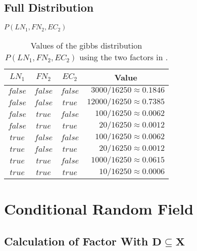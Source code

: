 \subsection{Full Distribution}\label{app:subsec-gd-full-distribution}
\begin{table}[h!]
\centering
$P(LN_1,FN_2,EC_2)$\par
\smallskip
\begin{tabular}{c c c r}
 \toprule
 $LN_1$ & $FN_2$ & $EC_2$ & \multicolumn{1}{c}{Value} \\
 \midrule
 $false$ & $false$ & $false$ & $3000/16250\approx0.1846$\\
 $false$ & $false$ & $true$  & $12000/16250\approx0.7385$\\
 $false$ & $true$  & $false$ & $100/16250\approx0.0062$\\
 $false$ & $true$  & $true$  & $20/16250\approx0.0012$\\
 $true$  & $false$ & $false$ & $100/16250\approx0.0062$\\
 $true$  & $false$ & $true$  & $20/16250\approx0.0012$\\
 $true$  & $true$  & $false$ & $1000/16250\approx0.0615$\\
 $true$  & $true$  & $true$  & $10/16250\approx0.0006$\\
 \bottomrule
\end{tabular}
\caption{Values of the \Gls{gibbs distribution} $P(LN_1,FN_2,EC_2)$ using the two \glspl{factor} in .}
\label{tab:example-factor-product}
\end{table}
\section{Conditional Random Field}\label{app:sec-conditional-random-field}
\subsection{Calculation of Factor With $\mathbf{D}\subseteq\mathbf{X}$}\label{app:subsec-gd-example-calculation}
